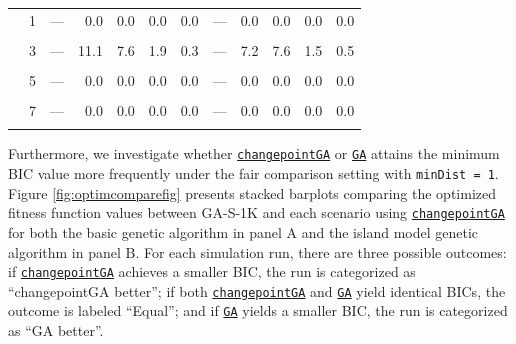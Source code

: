 \begin{table}[!h]
{\begin{tabular}[t]{>{}l|>{}l|rrrr>{}r|rrrrr}
 & 1 & --- & 0.0 & 0.0 & 0.0 & 0.0 & --- & 0.0 & 0.0 & 0.0 & 0.0\\
\addlinespace
\cellcolor{gray!10}{} & \cellcolor{gray!10}{2} & \cellcolor{gray!10}{---} & \cellcolor{gray!10}{88.0} & \cellcolor{gray!10}{92.2} & \cellcolor{gray!10}{98.1} & \cellcolor{gray!10}{99.7} & \cellcolor{gray!10}{---} & \cellcolor{gray!10}{92.3} & \cellcolor{gray!10}{92.0} & \cellcolor{gray!10}{98.5} & \cellcolor{gray!10}{99.5}\\
 & 3 & --- & 11.1 & 7.6 & 1.9 & 0.3 & --- & 7.2 & 7.6 & 1.5 & 0.5\\
\cellcolor{gray!10}{5} & \cellcolor{gray!10}{4} & \cellcolor{gray!10}{---} & \cellcolor{gray!10}{0.9} & \cellcolor{gray!10}{0.2} & \cellcolor{gray!10}{0.0} & \cellcolor{gray!10}{0.0} & \cellcolor{gray!10}{---} & \cellcolor{gray!10}{0.5} & \cellcolor{gray!10}{0.4} & \cellcolor{gray!10}{0.0} & \cellcolor{gray!10}{0.0}\\
 & 5 & --- & 0.0 & 0.0 & 0.0 & 0.0 & --- & 0.0 & 0.0 & 0.0 & 0.0\\
\cellcolor{gray!10}{} & \cellcolor{gray!10}{6} & \cellcolor{gray!10}{---} & \cellcolor{gray!10}{0.0} & \cellcolor{gray!10}{0.0} & \cellcolor{gray!10}{0.0} & \cellcolor{gray!10}{0.0} & \cellcolor{gray!10}{---} & \cellcolor{gray!10}{0.0} & \cellcolor{gray!10}{0.0} & \cellcolor{gray!10}{0.0} & \cellcolor{gray!10}{0.0}\\
\addlinespace
 & 7 & --- & 0.0 & 0.0 & 0.0 & 0.0 & --- & 0.0 & 0.0 & 0.0 & 0.0\\
\cellcolor{gray!10}{} & \cellcolor{gray!10}{>7} & \cellcolor{gray!10}{---} & \cellcolor{gray!10}{0.0} & \cellcolor{gray!10}{0.0} & \cellcolor{gray!10}{0.0} & \cellcolor{gray!10}{0.0} & \cellcolor{gray!10}{---} & \cellcolor{gray!10}{0.0} & \cellcolor{gray!10}{0.0} & \cellcolor{gray!10}{0.0} & \cellcolor{gray!10}{0.0}\\
\bottomrule
\end{tabular}}
\end{table}

Furthermore, we investigate whether \href{https://CRAN.R-project.org/package=changepointGA}{\texttt{changepointGA}} or \href{https://CRAN.R-project.org/package=GA}{\texttt{GA}} attains the minimum BIC value more frequently under the fair comparison setting with \texttt{minDist\ =\ 1}. Figure \ref{fig:optimcomparefig} presents stacked barplots comparing the optimized fitness function values between GA-S-1K and each scenario using \href{https://CRAN.R-project.org/package=changepointGA}{\texttt{changepointGA}} for both the basic genetic algorithm in panel A and the island model genetic algorithm in panel B. For each simulation run, there are three possible outcomes: if \href{https://CRAN.R-project.org/package=changepointGA}{\texttt{changepointGA}} achieves a smaller BIC, the run is categorized as ``changepointGA better''; if both \href{https://CRAN.R-project.org/package=changepointGA}{\texttt{changepointGA}} and \href{https://CRAN.R-project.org/package=GA}{\texttt{GA}} yield identical BICs, the outcome is labeled ``Equal''; and if \href{https://CRAN.R-project.org/package=GA}{\texttt{GA}} yields a smaller BIC, the run is categorized as ``GA better''.

